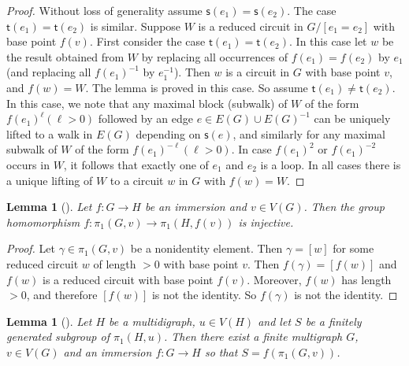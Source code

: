 \documentclass[10pt,a4paper]{amsart}
\newtheorem{lemma}[theorem]{Lemma}
\theoremstyle{definition}
\theoremstyle{definition}
\numberwithin{equation}{section}
\begin{document}
\begin{proof} Without loss of generality assume $\mathsf{s}(e_1)=\mathsf{s}(e_2)$. The case $\mathsf{t}(e_1)=\mathsf{t}(e_2)$ is similar. Suppose $W$ is a reduced circuit in $G/[e_1=e_2]$ with base point $f(v)$. First consider the case $\mathsf{t}(e_1)=\mathsf{t}(e_2)$. In this case let $w$ be the result obtained from $W$ by replacing all occurrences of $f(e_1)=f(e_2)$ by $e_1$ (and replacing all $f(e_1)^{-1}$ by $e_1^{-1}$). Then $w$ is a circuit in $G$ with base point $v$, and $f(w)=W$. The lemma is proved in this case. So assume $\mathsf{t}(e_1)\neq \mathsf{t}(e_2)$. In this case, we note that any maximal block (subwalk) of $W$ of the form $f(e_1)^\ell (\ell>0)$ followed by an edge $e\in E(G)\cup E(G)^{-1}$ can be uniquely lifted to a walk in $E(G)$ depending on $\mathsf{s}(e)$, and similarly for any maximal subwalk of $W$ of the form $f(e_1)^{-\ell} (\ell>0)$. In case $f(e_1)^2$ or $f(e_1)^{-2}$ occurs in $W$, it follows that exactly one of $e_1$ and $e_2$ is a loop. In all cases there is a unique lifting of $W$ to a circuit $w$ in $G$ with $f(w)=W$.
\end{proof}


\begin{lemma}[{\cite[Proposition 5.3]{St83}}] \label{lem:im2inj} Let $f\colon G\to H$ be an immersion and $v\in V(G)$. Then the group homomorphism $f\colon \pi_1(G, v)\to \pi_1(H, f(v))$ is injective.
\end{lemma}

\begin{proof} Let $\gamma\in \pi_1(G, v)$ be a nonidentity element. Then $\gamma=[w]$ for some reduced circuit $w$ of length $>0$ with base point $v$. Then $f(\gamma)=[f(w)]$ and $f(w)$ is a reduced circuit with base point $f(v)$. Moreover, $f(w)$ has length $>0$, and therefore $[f(w)]$ is not the identity. So $f(\gamma)$ is not the identity.
\end{proof}



\begin{lemma}[{\cite[5.4]{St83}}] \label{lem:rep} Let $H$ be a multidigraph, $u\in V(H)$ and let $S$ be a finitely generated subgroup of $\pi_1(H, u)$. Then there exist a finite multigraph $G$, $v\in V(G)$ and an immersion $f\colon G\to H$ so that $S=f(\pi_1(G, v))$.
\end{lemma}
\end{document}
